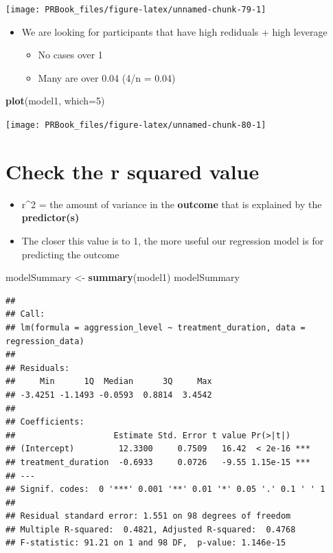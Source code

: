 \documentclass[
]{book}
\newenvironment{Shaded}{\begin{snugshade}}{\end{snugshade}}
\newcommand{\DataTypeTok}[1]{\textcolor[rgb]{0.13,0.29,0.53}{#1}}
\newcommand{\DecValTok}[1]{\textcolor[rgb]{0.00,0.00,0.81}{#1}}
\newcommand{\KeywordTok}[1]{\textcolor[rgb]{0.13,0.29,0.53}{\textbf{#1}}}
\newcommand{\NormalTok}[1]{#1}
\newcommand{\StringTok}[1]{\textcolor[rgb]{0.31,0.60,0.02}{#1}}
\providecommand{\tightlist}{%
  \setlength{\itemsep}{0pt}\setlength{\parskip}{0pt}}
\begin{document}
\begin{center}\texttt{[image: PRBook\_files/figure-latex/unnamed-chunk-79-1]} \end{center}

\begin{itemize}
\tightlist
\item
  We are looking for participants that have high rediduals + high leverage

  \begin{itemize}
  \tightlist
  \item
    No cases over 1
  \item
    Many are over 0.04 (4/n = 0.04)
  \end{itemize}
\end{itemize}

\begin{Shaded}
\begin{Highlighting}[]
\KeywordTok{plot}\NormalTok{(model1, }\DataTypeTok{which=}\DecValTok{5}\NormalTok{)}
\end{Highlighting}
\end{Shaded}

\begin{center}\texttt{[image: PRBook\_files/figure-latex/unnamed-chunk-80-1]} \end{center}

\hypertarget{check-the-r-squared-value}{%
\section{Check the r squared value}\label{check-the-r-squared-value}}

\begin{itemize}
\tightlist
\item
  r\^{}2 = the amount of variance in the \textbf{outcome} that is explained by the \textbf{predictor(s)}
\item
  The closer this value is to 1, the more useful our regression model is for predicting the outcome
\end{itemize}

\begin{Shaded}
\begin{Highlighting}[]
\NormalTok{modelSummary <-}\StringTok{ }\KeywordTok{summary}\NormalTok{(model1)}
\NormalTok{modelSummary}
\end{Highlighting}
\end{Shaded}

\begin{verbatim}
## 
## Call:
## lm(formula = aggression_level ~ treatment_duration, data = regression_data)
## 
## Residuals:
##     Min      1Q  Median      3Q     Max 
## -3.4251 -1.1493 -0.0593  0.8814  3.4542 
## 
## Coefficients:
##                    Estimate Std. Error t value Pr(>|t|)    
## (Intercept)         12.3300     0.7509   16.42  < 2e-16 ***
## treatment_duration  -0.6933     0.0726   -9.55 1.15e-15 ***
## ---
## Signif. codes:  0 '***' 0.001 '**' 0.01 '*' 0.05 '.' 0.1 ' ' 1
## 
## Residual standard error: 1.551 on 98 degrees of freedom
## Multiple R-squared:  0.4821, Adjusted R-squared:  0.4768 
## F-statistic: 91.21 on 1 and 98 DF,  p-value: 1.146e-15
\end{verbatim}
\end{document}
